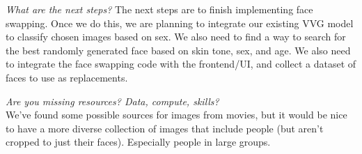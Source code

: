 \textit{What are the next steps?}
The next steps are to finish implementing face swapping. Once we do this, we are planning to integrate our existing VVG model to classify chosen images based on sex. We also need to find a way to search for the best randomly generated face based on skin tone, sex, and age.
We also need to integrate the face swapping code with the frontend/UI, and collect a dataset of faces to use as replacements.

%
\textit{Are you missing resources? Data, compute, skills?}\\
We've found some possible sources for images from movies, but it would be nice to have a more diverse collection of images that include people (but aren't cropped to just their faces). Especially people in large groups.


